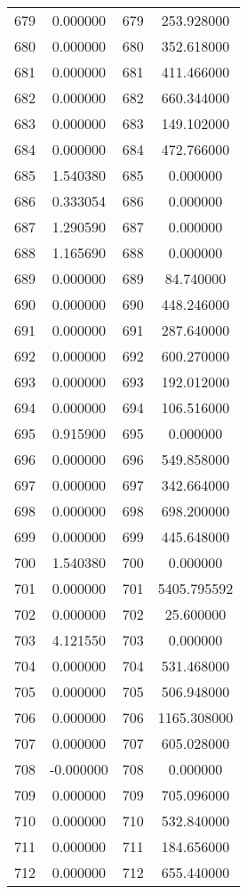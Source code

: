 \documentclass[12pt]{article}
\begin{document}
\begin{longtable}{@{}cccc@{}}
679 & 0.000000 & 679 & 253.928000 \\
680 & 0.000000 & 680 & 352.618000 \\
681 & 0.000000 & 681 & 411.466000 \\
682 & 0.000000 & 682 & 660.344000 \\
683 & 0.000000 & 683 & 149.102000 \\
684 & 0.000000 & 684 & 472.766000 \\
685 & 1.540380 & 685 & 0.000000 \\
686 & 0.333054 & 686 & 0.000000 \\
687 & 1.290590 & 687 & 0.000000 \\
688 & 1.165690 & 688 & 0.000000 \\
689 & 0.000000 & 689 & 84.740000 \\
690 & 0.000000 & 690 & 448.246000 \\
691 & 0.000000 & 691 & 287.640000 \\
692 & 0.000000 & 692 & 600.270000 \\
693 & 0.000000 & 693 & 192.012000 \\
694 & 0.000000 & 694 & 106.516000 \\
695 & 0.915900 & 695 & 0.000000 \\
696 & 0.000000 & 696 & 549.858000 \\
697 & 0.000000 & 697 & 342.664000 \\
698 & 0.000000 & 698 & 698.200000 \\
699 & 0.000000 & 699 & 445.648000 \\
700 & 1.540380 & 700 & 0.000000 \\
701 & 0.000000 & 701 & 5405.795592 \\
702 & 0.000000 & 702 & 25.600000 \\
703 & 4.121550 & 703 & 0.000000 \\
704 & 0.000000 & 704 & 531.468000 \\
705 & 0.000000 & 705 & 506.948000 \\
706 & 0.000000 & 706 & 1165.308000 \\
707 & 0.000000 & 707 & 605.028000 \\
708 & -0.000000 & 708 & 0.000000 \\
709 & 0.000000 & 709 & 705.096000 \\
710 & 0.000000 & 710 & 532.840000 \\
711 & 0.000000 & 711 & 184.656000 \\
712 & 0.000000 & 712 & 655.440000 \\

\end{longtable}
\end{document}
